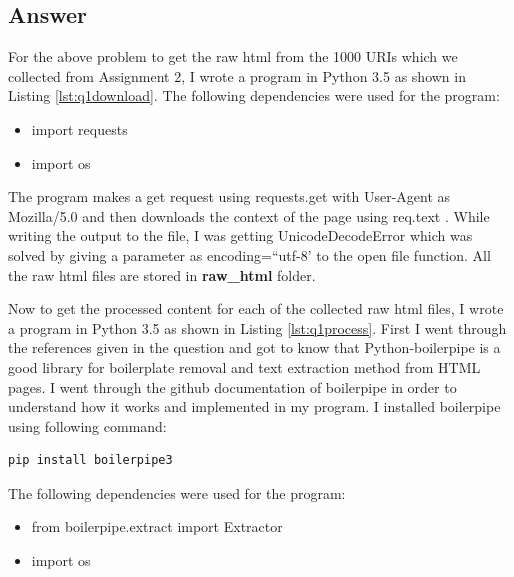 \documentclass[letterpaper,11pt]{article}
\begin{document}
\subsection*{Answer}

For the above problem to get the raw html from the 1000 URIs which we collected from Assignment 2, I wrote a program in Python 3.5 as shown in Listing \ref{lst:q1download}.  The following dependencies were used for the program:

\begin{itemize}
    \item import requests
    \item import os
\end{itemize}

The program makes a get request using requests.get with User-Agent as Mozilla/5.0 and then downloads the context of the page using req.text \cite{requestref}. While writing the output to the file, I was getting UnicodeDecodeError which was solved by giving a parameter as encoding=``utf-8' \cite{unicoderef} to the open file function. All the raw html files are stored in \textbf{raw\_html} folder.



Now to get the processed content for each of the collected raw html files, I wrote a program in Python 3.5 as shown in Listing \ref{lst:q1process}. First I went through the references \cite{boilerpiperef} \cite{gitref} given in the question and got to know that Python-boilerpipe is a good library for boilerplate removal and text extraction method from HTML pages. I went through the github documentation of boilerpipe \cite{gitref} in order to understand how it works and implemented in my program. I installed boilerpipe using following command:

\begin{lstlisting}[frame=single]
pip install boilerpipe3
\end{lstlisting}

The following dependencies were used for the program:


\begin{itemize}
    \item from boilerpipe.extract import Extractor
    \item import os
\end{itemize}
\end{document}
